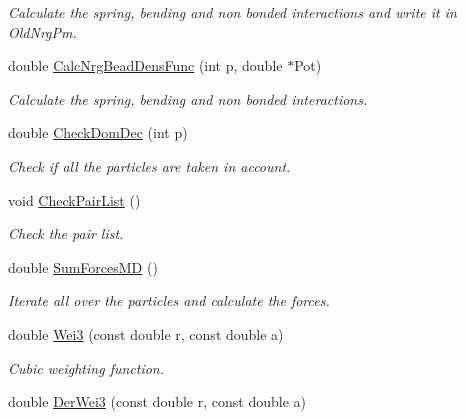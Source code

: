 \begin{DoxyCompactItemize}
\begin{DoxyCompactList}\small\item\em \-Calculate the spring, bending and non bonded interactions and write it in \-Old\-Nrg\-Pm. \end{DoxyCompactList}\item 
double \hyperlink{classForces_ab18a8becb1983fc28fbeadea39623079}{\-Calc\-Nrg\-Bead\-Dens\-Func} (int p, double $\ast$\-Pot)
\begin{DoxyCompactList}\small\item\em \-Calculate the spring, bending and non bonded interactions. \end{DoxyCompactList}\item 
double \hyperlink{classForces_a2595efd4257201b5b7c30c73086f94c3}{\-Check\-Dom\-Dec} (int p)
\begin{DoxyCompactList}\small\item\em \-Check if all the particles are taken in account. \end{DoxyCompactList}\item 
\hypertarget{classForces_a419ca9dee6d5e955abe44cf409e24d66}{void \hyperlink{classForces_a419ca9dee6d5e955abe44cf409e24d66}{\-Check\-Pair\-List} ()}\label{classForces_a419ca9dee6d5e955abe44cf409e24d66}

\begin{DoxyCompactList}\small\item\em \-Check the pair list. \end{DoxyCompactList}\item 
\hypertarget{classForces_a791c1d5f301eb9c0d39c43a180eaf737}{double \hyperlink{classForces_a791c1d5f301eb9c0d39c43a180eaf737}{\-Sum\-Forces\-M\-D} ()}\label{classForces_a791c1d5f301eb9c0d39c43a180eaf737}

\begin{DoxyCompactList}\small\item\em \-Iterate all over the particles and calculate the forces. \end{DoxyCompactList}\item 
\hypertarget{classForces_a5c95469e44bbbea88c38809308ca4551}{double \hyperlink{classForces_a5c95469e44bbbea88c38809308ca4551}{\-Wei3} (const double r, const double a)}\label{classForces_a5c95469e44bbbea88c38809308ca4551}

\begin{DoxyCompactList}\small\item\em \-Cubic weighting function. \end{DoxyCompactList}\item 
\hypertarget{classForces_a3d44e49e6ced82a300d6071060b72c48}{double \hyperlink{classForces_a3d44e49e6ced82a300d6071060b72c48}{\-Der\-Wei3} (const double r, const double a)}\label{classForces_a3d44e49e6ced82a300d6071060b72c48}


\end{DoxyCompactItemize}

